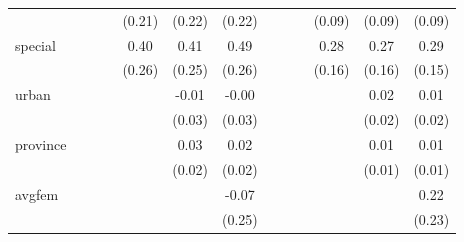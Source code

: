 \documentclass{article}
\begin{document}
{\begin{tabular}{l*{12}{c}}
            &                     &                     &                     &      (0.21)         &      (0.22)         &      (0.22)         &                     &                     &                     &      (0.09)         &      (0.09)         &      (0.09)         \\
[1em]
special     &                     &                     &                     &        0.40         &        0.41         &        0.49\sym{*}  &                     &                     &                     &        0.28\sym{*}  &        0.27\sym{*}  &        0.29\sym{*}  \\
            &                     &                     &                     &      (0.26)         &      (0.25)         &      (0.26)         &                     &                     &                     &      (0.16)         &      (0.16)         &      (0.15)         \\
[1em]
urban       &                     &                     &                     &                     &       -0.01         &       -0.00         &                     &                     &                     &                     &        0.02         &        0.01         \\
            &                     &                     &                     &                     &      (0.03)         &      (0.03)         &                     &                     &                     &                     &      (0.02)         &      (0.02)         \\
[1em]
province    &                     &                     &                     &                     &        0.03         &        0.02         &                     &                     &                     &                     &        0.01         &        0.01         \\
            &                     &                     &                     &                     &      (0.02)         &      (0.02)         &                     &                     &                     &                     &      (0.01)         &      (0.01)         \\
[1em]
avgfem      &                     &                     &                     &                     &                     &       -0.07         &                     &                     &                     &                     &                     &        0.22         \\
            &                     &                     &                     &                     &                     &      (0.25)         &                     &                     &                     &                     &                     &      (0.23)         \\

\end{tabular}}
\end{document}
